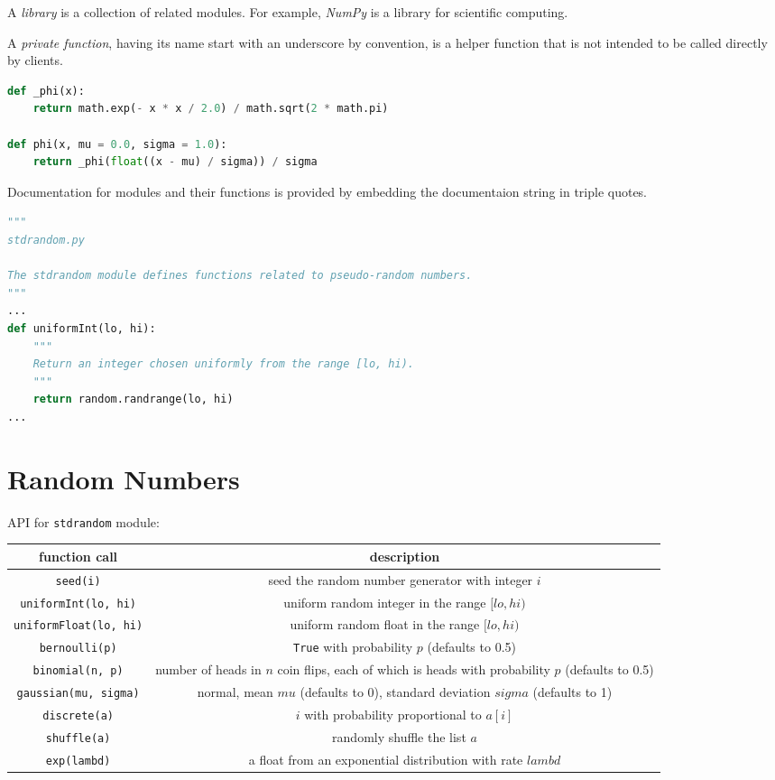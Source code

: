 \documentclass[8pt,a4paper,compress,handout]{beamer}
\begin{document}
\begin{frame}[fragile]
A \emph{library} is a collection of related modules. For example, \emph{NumPy} is a library for scientific computing.

\bigskip

A \emph{private function}, having its name start with an underscore by convention, is a helper function that is not intended to be called directly by clients. 
\begin{lstlisting}[language=Python]
def _phi(x):
    return math.exp(- x * x / 2.0) / math.sqrt(2 * math.pi)
    
def phi(x, mu = 0.0, sigma = 1.0):
    return _phi(float((x - mu) / sigma)) / sigma
\end{lstlisting}

\bigskip

Documentation for modules and their functions is provided by embedding the documentaion string in triple quotes.
\begin{lstlisting}[language=Python]
"""
stdrandom.py

The stdrandom module defines functions related to pseudo-random numbers.
"""
...
def uniformInt(lo, hi):
    """
    Return an integer chosen uniformly from the range [lo, hi).
    """
    return random.randrange(lo, hi)
...
\end{lstlisting}
\end{frame}

\section{Random Numbers}
\begin{frame}[fragile]
API for \lstinline{stdrandom} module:
\begin{center}
\begin{tabular}{cc}
function call & description \\ \hline
\lstinline$seed(i)$ & seed the random number generator with integer $i$ \\
\lstinline$uniformInt(lo, hi)$ & uniform random integer in the range $[lo, hi)$ \\
\lstinline$uniformFloat(lo, hi)$ & uniform random float in the range $[lo, hi)$ \\
\lstinline$bernoulli(p)$ & \lstinline$True$ with probability $p$ (defaults to 0.5) \\
\lstinline$binomial(n, p)$ & \makecell{number of heads in $n$ coin flips, each of which is \\ heads with probability $p$ (defaults to 0.5)} \\
\lstinline$gaussian(mu, sigma)$ &  \makecell{normal, mean $mu$ (defaults to 0), \\ standard deviation $sigma$ (defaults to 1)} \\
\lstinline$discrete(a)$ & $i$ with probability proportional to $a[i]$ \\
\lstinline$shuffle(a)$ & randomly shuffle the list $a$ \\
\lstinline$exp(lambd)$ & a float from an exponential distribution with rate $lambd$ 
\end{tabular} 
\end{center}
\end{frame}
\end{document}

